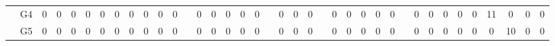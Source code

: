 \documentclass[12pt]{article}
\begin{document}
\begin{table}[!ht]
{\begin{tabular}{cccccccccccccccccccccccccccccccccccccc}
\multicolumn{1}{c|}{}                       & \multicolumn{1}{c|}{G4}  & \multicolumn{1}{c|}{0}  & \multicolumn{1}{c|}{0}  & \multicolumn{1}{c|}{0}  & \multicolumn{1}{c|}{0}  & \multicolumn{1}{c|}{0}  & \multicolumn{1}{c|}{0}  & \multicolumn{1}{c|}{0}  & \multicolumn{1}{c|}{0}  & \multicolumn{1}{c|}{0}  & \multicolumn{1}{c|}{0}  & \multicolumn{1}{c|}{}                     & \multicolumn{1}{c|}{0}  & \multicolumn{1}{c|}{0}  & \multicolumn{1}{c|}{0}  & \multicolumn{1}{c|}{0}  & \multicolumn{1}{c|}{0}  & \multicolumn{1}{c|}{}                     & \multicolumn{1}{c|}{0}  & \multicolumn{1}{c|}{0}  & \multicolumn{1}{c|}{0}  & \multicolumn{1}{c|}{}                     & \multicolumn{1}{c|}{0}  & \multicolumn{1}{c|}{0}  & \multicolumn{1}{c|}{0}  & \multicolumn{1}{c|}{0}  & \multicolumn{1}{c|}{0}  & \multicolumn{1}{c|}{}                     & \multicolumn{1}{c|}{0}  & \multicolumn{1}{c|}{0}  & \multicolumn{1}{c|}{0}  & \multicolumn{1}{c|}{0}  & \multicolumn{1}{c|}{0}  & \multicolumn{1}{c|}{11} & \multicolumn{1}{c|}{0}  & \multicolumn{1}{c|}{0}  & \multicolumn{1}{c|}{0}  \\ \cline{2-12} \cline{14-18} \cline{20-22} \cline{24-28} \cline{30-38} 
\multicolumn{1}{c|}{}                       & \multicolumn{1}{c|}{G5}  & \multicolumn{1}{c|}{0}  & \multicolumn{1}{c|}{0}  & \multicolumn{1}{c|}{0}  & \multicolumn{1}{c|}{0}  & \multicolumn{1}{c|}{0}  & \multicolumn{1}{c|}{0}  & \multicolumn{1}{c|}{0}  & \multicolumn{1}{c|}{0}  & \multicolumn{1}{c|}{0}  & \multicolumn{1}{c|}{0}  & \multicolumn{1}{c|}{}                     & \multicolumn{1}{c|}{0}  & \multicolumn{1}{c|}{0}  & \multicolumn{1}{c|}{0}  & \multicolumn{1}{c|}{0}  & \multicolumn{1}{c|}{0}  & \multicolumn{1}{c|}{}                     & \multicolumn{1}{c|}{0}  & \multicolumn{1}{c|}{0}  & \multicolumn{1}{c|}{0}  & \multicolumn{1}{c|}{}                     & \multicolumn{1}{c|}{0}  & \multicolumn{1}{c|}{0}  & \multicolumn{1}{c|}{0}  & \multicolumn{1}{c|}{0}  & \multicolumn{1}{c|}{0}  & \multicolumn{1}{c|}{}                     & \multicolumn{1}{c|}{0}  & \multicolumn{1}{c|}{0}  & \multicolumn{1}{c|}{0}  & \multicolumn{1}{c|}{0}  & \multicolumn{1}{c|}{0}  & \multicolumn{1}{c|}{0}  & \multicolumn{1}{c|}{10} & \multicolumn{1}{c|}{0}  & \multicolumn{1}{c|}{0}  \\ \cline{2-12} \cline{14-18} \cline{20-22} \cline{24-28} \cline{30-38} 

\end{tabular}}
\end{table}
\end{document}
